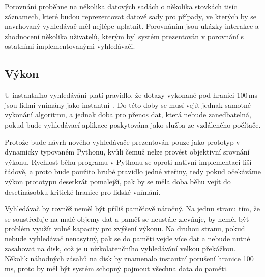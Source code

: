\documentclass[11pt,letterpaper,oneside,openright]{book}
\begin{document}
Porovnání proběhne na několika datových sadách o několika stovkách tisíc
záznamech, které budou reprezentovat datové sady pro případy, ve kterých by se
navrhovaný vyhledávač měl nejlépe uplatnit. Porovnáním jsou ukázky interakce a
zhodnocení několika uživatelů, kterým byl systém prezentován v porovnání s
ostatními implementovanými vyhledávači.

\subsection{Výkon}
U instantního vyhledávání platí pravidlo, že dotazy vykonané pod hranici
100\,ms jsou lidmi vnímány jako instantní~\cite{sto_ms}. Do této doby se musí
vejít jednak samotné vykonání algoritmu, a jednak doba pro přenos dat, která
nebude zanedbatelná, pokud bude vyhledávací aplikace poskytována jako služba ze
vzdáleného počítače.

Protože bude návrh nového vyhledávače prezentován pouze jako prototyp v
dynamicky typovaném Pythonu, kvůli čemuž nelze provést objektivní srovnání
výkonu. Rychlost běhu programu v Pythonu se oproti nativní implementaci liší
řádově, a proto bude použito hrubé pravidlo jedné vteřiny, tedy pokud očekáváme
výkon prototypu desetkrát pomalejší, pak by se měla doba běhu vejít do
desetinásobku kritické hranice pro lidské vnímání.

Vyhledávač by rovněž neměl být příliš paměťově náročný. Na jednu stranu tím, že
se soustřeďuje na malé objemy dat a paměť se neustále zlevňuje, by neměl být
problém využít volné kapacity pro zvýšení výkonu. Na druhou stranu, pokud
nebude vyhledávač nenasytný, pak se do paměti vejde více dat a nebude nutné
zasahovat na disk, což je u nízkolatenčního vyhledávání velkou překážkou.
Několik náhodných zásahů na disk by znamenalo instantní porušení hranice
100\,ms, proto by měl být systém schopný pojmout všechna data do paměti.
\end{document}
